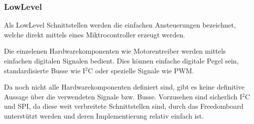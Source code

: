 \subsubsection{LowLevel}
Als LowLevel Schnittstellen werden die einfachen Ansteuerungen
bezeichnet, welche direkt mittels eines Miktrocontroller erzeugt
werden.

Die einzelenen Hardwarekomponenten wie Motorentreiber werden mittels
einfachen digitalen Signalen bedient. Dies können einfache digitale
Pegel sein, standardisierte Busse wie I$^2$C oder spezielle Signale
wie PWM. 

Da noch nicht alle Hardwarekomponenten definiert sind, gibt es keine
definitive Aussage über die verwendeten Signale bzw. Busse. Vorzusehen
sind sicherlich I$^2$C und SPI, da diese weit verbreitete Schnittstellen
sind, durch das Freedomboard unterstützt werden und deren
Implementierung relativ einfach ist.
